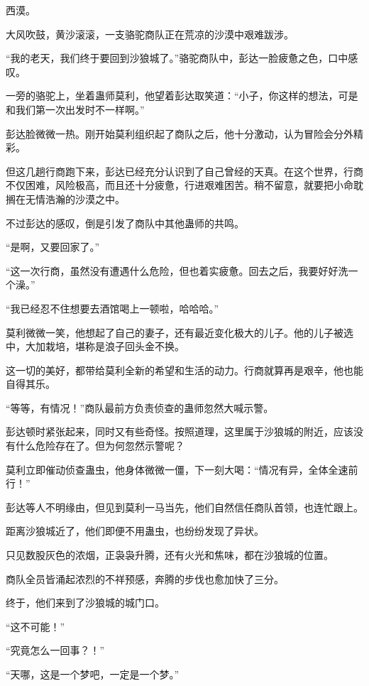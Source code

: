 
\begin{this_body}

西漠。

大风吹鼓，黄沙滚滚，一支骆驼商队正在荒凉的沙漠中艰难跋涉。

“我的老天，我们终于要回到沙狼城了。”骆驼商队中，彭达一脸疲惫之色，口中感叹。

一旁的骆驼上，坐着蛊师莫利，他望着彭达取笑道：“小子，你这样的想法，可是和我们第一次出发时不一样啊。”

彭达脸微微一热。刚开始莫利组织起了商队之后，他十分激动，认为冒险会分外精彩。

但这几趟行商跑下来，彭达已经充分认识到了自己曾经的天真。在这个世界，行商不仅困难，风险极高，而且还十分疲惫，行进艰难困苦。稍不留意，就要把小命耽搁在无情浩瀚的沙漠之中。

不过彭达的感叹，倒是引发了商队中其他蛊师的共鸣。

“是啊，又要回家了。”

“这一次行商，虽然没有遭遇什么危险，但也着实疲惫。回去之后，我要好好洗一个澡。”

“我已经忍不住想要去酒馆喝上一顿啦，哈哈哈。”

莫利微微一笑，他想起了自己的妻子，还有最近变化极大的儿子。他的儿子被选中，大加栽培，堪称是浪子回头金不换。

这一切的美好，都带给莫利全新的希望和生活的动力。行商就算再是艰辛，他也能自得其乐。

“等等，有情况！”商队最前方负责侦查的蛊师忽然大喊示警。

彭达顿时紧张起来，同时又有些奇怪。按照道理，这里属于沙狼城的附近，应该没有什么危险存在了。但为何忽然示警呢？

莫利立即催动侦查蛊虫，他身体微微一僵，下一刻大喝：“情况有异，全体全速前行！”

彭达等人不明缘由，但见到莫利一马当先，他们自然信任商队首领，也连忙跟上。

距离沙狼城近了，他们即便不用蛊虫，也纷纷发现了异状。

只见数股灰色的浓烟，正袅袅升腾，还有火光和焦味，都在沙狼城的位置。

商队全员皆涌起浓烈的不祥预感，奔腾的步伐也愈加快了三分。

终于，他们来到了沙狼城的城门口。

“这不可能！”

“究竟怎么一回事？！”

“天哪，这是一个梦吧，一定是一个梦。”


\end{this_body}
